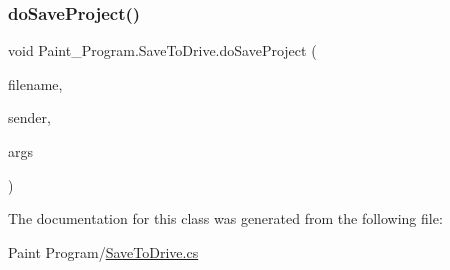 \mbox{\label{class_paint___program_1_1_save_to_drive_a76739416bfdb48941e22807b8ae03dea}} 
\subsubsection{\texorpdfstring{do\+Save\+Project()}{doSaveProject()}}
{\footnotesize\ttfamily void Paint\+\_\+\+Program.\+Save\+To\+Drive.\+do\+Save\+Project (\begin{DoxyParamCaption}\item[{string}]{filename,  }\item[{object}]{sender,  }\item[{Do\+Work\+Event\+Args}]{args }\end{DoxyParamCaption})\hspace{0.3cm}{\ttfamily [inline]}}



The documentation for this class was generated from the following file\+:\begin{DoxyCompactItemize}
\item 
Paint Program/\mbox{\hyperlink{_save_to_drive_8cs}{Save\+To\+Drive.\+cs}}\end{DoxyCompactItemize}
